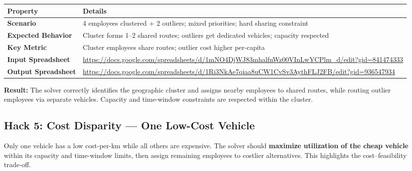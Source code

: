 \documentclass[11pt,a4paper]{article}
\begin{document}
\begin{table}[H]
\centering
\begin{tabular}{p{3.5cm}p{10cm}}
\toprule
\textbf{Property} & \textbf{Details} \\
\midrule
\rowcolor{rowalt}
\textbf{Scenario} & 4 employees clustered + 2 outliers; mixed priorities; hard sharing constraint \\
\textbf{Expected Behavior} & Cluster forms 1--2 shared routes; outliers get dedicated vehicles; capacity respected \\
\rowcolor{rowalt}
\textbf{Key Metric} & Cluster employees share routes; outlier cost higher per-capita \\
\textbf{Input Spreadsheet} & \scriptsize\url{https://docs.google.com/spreadsheets/d/1mNO4DjWJ83mhalfnWz00VInLwYCPlm_d/edit?gid=841474333} \\
\rowcolor{rowalt}
\textbf{Output Spreadsheet} & \scriptsize\url{https://docs.google.com/spreadsheets/d/1Ri3NkAe7qiaa8uCW1CvSv3AythFLJ2FB/edit?gid=936547934} \\
\bottomrule
\end{tabular}
\end{table}

\begin{resultbox}
\textbf{Result:} The solver correctly identifies the geographic cluster and assigns nearby employees to shared routes, while routing outlier employees via separate vehicles. Capacity and time-window constraints are respected within the cluster.
\end{resultbox}


\subsection{Hack 5: Cost Disparity --- One Low-Cost Vehicle}

\begin{hackbox}
Only one vehicle has a low cost-per-km while all others are expensive. The solver should \textbf{maximize utilization of the cheap vehicle} within its capacity and time-window limits, then assign remaining employees to costlier alternatives. This highlights the cost--feasibility trade-off.
\end{hackbox}
\end{document}
